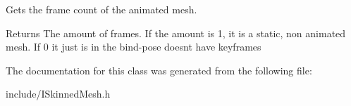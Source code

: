 Gets the frame count of the animated mesh. 

\begin{DoxyReturn}{Returns}
The amount of frames. If the amount is 1, it is a static, non animated mesh. If 0 it just is in the bind-\/pose doesn\textquotesingle{}t have keyframes 
\end{DoxyReturn}


The documentation for this class was generated from the following file\+:\begin{DoxyCompactItemize}
\item 
include/I\+Skinned\+Mesh.\+h\end{DoxyCompactItemize}
